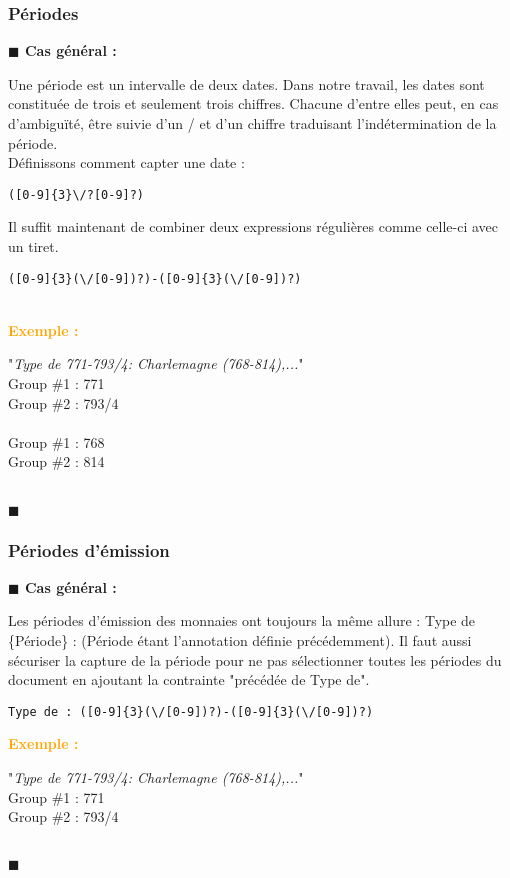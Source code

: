 \documentclass[a4paper, 11pt]{article}
\newenvironment{general}
    {
    \noindent\textbf{\textcolor{dark-blue}{$\blacksquare$  Cas général : \\}}
    }
    {
    ~\\\noindent\textcolor{dark-blue}{$\blacksquare$}\\
    }
\newenvironment{exemple}
    {
    \noindent\textbf{\textcolor{orange}{
    Exemple : \\}}
    }
    {\\
    }
\begin{document}
\subsubsection{Périodes}
\begin{general}
Une période est un intervalle de deux dates. Dans notre travail, les dates sont constituée de trois et seulement trois chiffres. Chacune d'entre elles peut, en cas d’ambiguïté, être suivie d'un \og/\fg{} et d'un chiffre traduisant l'indétermination de la période.\\
 Définissons comment capter une date : 
\begin{verbatim}
([0-9]{3}\/?[0-9]?)
\end{verbatim}

Il suffit maintenant de combiner deux expressions régulières comme celle-ci avec un tiret.
\begin{verbatim}
([0-9]{3}(\/[0-9])?)-([0-9]{3}(\/[0-9])?)
\end{verbatim}
~\\
\begin{exemple}
"\emph{Type de 771-793/4: Charlemagne (768-814),...}" \\
Group \#1 : 771 \\
Group \#2 : 793/4\\\\\noindent
Group \#1 : 768 \\
Group \#2 : 814
\end{exemple}
\end{general}

\subsubsection{Périodes d'émission}
\begin{general}
Les périodes d'émission des monnaies ont toujours la même allure : \og Type de \{Période\} : \fg{} (Période étant l'annotation définie précédemment).
Il faut aussi sécuriser la capture de la période pour ne pas sélectionner toutes les périodes du document en ajoutant la contrainte "précédée de Type de".
\begin{verbatim}
Type de : ([0-9]{3}(\/[0-9])?)-([0-9]{3}(\/[0-9])?)
\end{verbatim}
\begin{exemple}
"\emph{Type de 771-793/4: Charlemagne (768-814),...}" \\
Group \#1 : 771 \\
Group \#2 : 793/4
\end{exemple}
\end{general}
\end{document}
